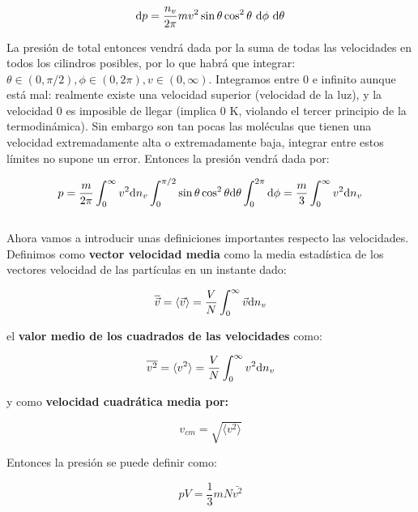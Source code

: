 \documentclass[12pt,a4paper,oneside]{book}
\begin{document}
\begin{equation}
\mathrm{d} p = \dfrac{n_v}{2 \pi} m v^2 \sin \theta \cos^2 \theta \ \mathrm{d} \phi \ \mathrm{d} \theta 
\end{equation}

La presión de total entonces vendrá dada por la suma de todas las velocidades en todos los cilindros posibles, por lo que habrá que integrar: $\theta \in (0,\pi/2), \phi \in (0, 2 \pi), v \in (0, \infty)$. Integramos entre 0 e infinito aunque está mal: realmente existe una velocidad superior (velocidad de la luz), y la velocidad $0$ es imposible de llegar (implica 0 K, violando el tercer principio de la termodinámica). Sin embargo son tan pocas las moléculas que tienen una velocidad extremadamente alta o extremadamente baja, integrar entre estos límites no supone un error. Entonces la presión vendrá dada por:

\begin{equation}
p = \dfrac{m}{2 \pi} \int_{0}^{\infty} v^2 \mathrm{d} n_v \int_{0}^{\pi/2} \sin \theta \cos^2 \theta \mathrm{d} \theta \int_0^{2 \pi} \mathrm{d} \phi = \dfrac{m}{3} \int_{0}^{\infty} v^2 \mathrm{d} n_v
\end{equation}\\



Ahora vamos a introducir unas definiciones importantes respecto las velocidades. Definimos como \textbf{vector velocidad media} como la media estadística de los vectores velocidad de las partículas en un instante dado:

\begin{equation}
\overline{\vec{v}}= \langle \vec{v} \rangle = \dfrac{V}{N} \int_{0}^{\infty} \vec{v} \mathrm{d} n_v
\end{equation}

el \textbf{valor medio de los cuadrados de las velocidades} como:

\begin{equation}
\overline{v^2} = \langle v^2 \rangle = \dfrac{V}{N} \int_{0}^{\infty} v^2 \mathrm{d} n_v
\end{equation}

y como \textbf{velocidad cuadrática media por:}

\begin{equation}
v_{cm} = \sqrt{ \langle v^2 \rangle}
\end{equation}

Entonces la presión se puede definir como:

\begin{equation}
p V = \dfrac{1}{3} m N \bar{v^2}
\end{equation}
\end{document}
